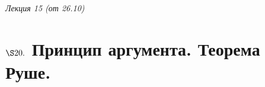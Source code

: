 \begin{flushright}
    \textit{Лекция 15 (от 26.10)}
\end{flushright}
\section{$\S 20.$ Принцип аргумента. Теорема Руше.}
